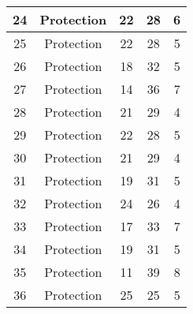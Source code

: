 \documentclass[results.tex]{subfiles}
\begin{document}
\begin{center}
\begin{tabular}{| c || c | c | c | c |}
            \hline
            24                      & Protection                   & 22                     & 28                      & 6                    \\
            \hline
            25                      & Protection                   & 22                     & 28                      & 5                    \\
            \hline
            26                      & Protection                   & 18                     & 32                      & 5                    \\
            \hline
            27                      & Protection                   & 14                     & 36                      & 7                    \\
            \hline
            28                      & Protection                   & 21                     & 29                      & 4                    \\
            \hline
            29                      & Protection                   & 22                     & 28                      & 5                    \\
            \hline
            30                      & Protection                   & 21                     & 29                      & 4                    \\
            \hline
            31                      & Protection                   & 19                     & 31                      & 5                    \\
            \hline
            32                      & Protection                   & 24                     & 26                      & 4                    \\
            \hline
            33                      & Protection                   & 17                     & 33                      & 7                    \\
            \hline
            34                      & Protection                   & 19                     & 31                      & 5                    \\
            \hline
            35                      & Protection                   & 11                     & 39                      & 8                    \\
            \hline
            36                      & Protection                   & 25                     & 25                      & 5                    \\

\end{tabular}
\end{center}
\end{document}
